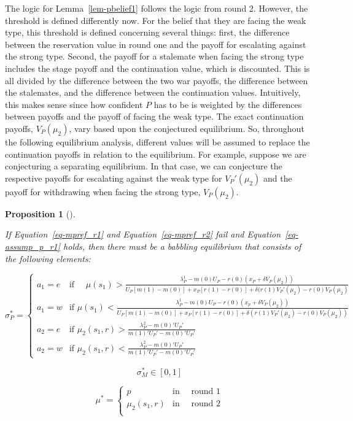 \documentclass[
  12pt,
]{article}
\theoremstyle{plain}
\theoremstyle{plain}
\newtheorem{proposition}{Proposition}[section]
\theoremstyle{remark}
\begin{document}
The logic for Lemma~\ref{lem-pbelief1} follows the logic from round 2.
However, the threshold is defined differently now. For the belief that
they are facing the weak type, this threshold is defined concerning
several things: first, the difference between the reservation value in
round one and the payoff for escalating against the strong type. Second,
the payoff for a stalemate when facing the strong type includes the
stage payoff and the continuation value, which is discounted. This is
all divided by the difference between the two war payoffs, the
difference between the stalemates, and the difference between the
continuation values. Intuitively, this makes sense since how confident
\(P\) has to be is weighted by the differences between payoffs and the
payoff of facing the weak type. The exact continuation payoffs,
\(V_P(\mu_2)\), vary based upon the conjectured equilibrium. So,
throughout the following equilibrium analysis, different values will be
assumed to replace the continuation payoffs in relation to the
equilibrium. For example, suppose we are conjecturing a separating
equilibrium. In that case, we can conjecture the respective payoffs for
escalating against the weak type for \(V_P'(\mu_2)\) and the payoff for
withdrawing when facing the strong type, \(V_P(\mu_2)\).

\begin{proposition}[]\protect\hypertarget{prp-unaligned1}{}\label{prp-unaligned1}

If Equation~\ref{eq-mpref_r1} and Equation~\ref{eq-mpref_r2} fail and
Equation~\ref{eq-assump_p_r1} holds, then there must be a babbling
equilibrium that consists of the following elements:

\[
\sigma^{*}_P = 
\begin{cases}
a_1= e  & \text{if } \quad\mu(s_1)
> \frac{\lambda^1_P - m(0)U_P - r(0)(x_P + \delta V_P(\mu_2))}
 {U_P[ m(1) - m(0) ]+ x_P [r(1) -r(0)] 
 + \delta (r(1)V_P'(\mu_2) - r(0)V_P(\mu_2)}\\
a_1 = w  & \text{if } \mu(s_1)
< \frac{\lambda^1_P - m(0)U_P - r(0)(x_p + \delta V_P(\mu_2))}
 {U_P[ m(1) - m(0) ]+ x_P [r(1) -r(0)] 
 + \delta (r(1)V_P'(\mu_2) - r(0)V_P(\mu_2))}\\
a_2 = e & \text{if } \mu_2(s_1, r) > \frac{\lambda^2_P - m(0)' U_P '}{m(1)' U_P' - m(0)' U_P'}\\
a_2 = w & \text{if } \mu_2(s_1, r) < \frac{\lambda^2_P - m(0)' U_P '}{m(1)' U_P' - m(0)' U_P'}
\end{cases}
\]

\[
\sigma^{*}_M \in [0, 1]
\]

\[
\mu^*= 
\begin{cases}
p  & \text{in } \quad \text{round 1}\\
\mu_2(s_1, r)  & \text{in } \quad \text{round 2}\\
\end{cases}
\]

\end{proposition}
\end{document}
